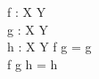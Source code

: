 \documentclass[a4paper,10pt,fleqn]{article}
\begin{document}
\begin{zed}
[X, Y]
\end{zed}

\begin{axdef}
f : X \fun Y \\
g : X \fun Y \\
h : X \fun Y
\where
f \oplus g = g \\
f \oplus g \oplus h = h
\end{axdef}
\end{document}
